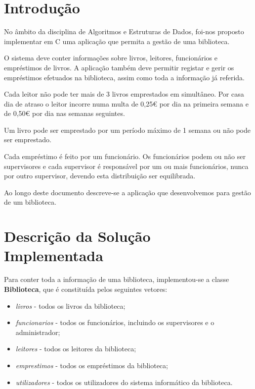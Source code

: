 \documentclass[12pt,a4paper,reqno]{report}
\numberwithin{figure}{section}
\numberwithin{equation}{section}
\def\Cpp{C\raisebox{0.5ex}{\tiny\textbf{++}}}
\begin{document}


\tableofcontents

\chapter{Introdução}

No âmbito da disciplina de Algoritmos e Estruturas de Dados, foi-nos proposto implementar em \Cpp{} uma aplicação que permita a gestão de uma biblioteca.

O sistema deve conter informações sobre livros, leitores, funcionários e empréstimos de livros. A aplicação também deve permitir registar e gerir os empréstimos efetuados na biblioteca, assim como toda a informação já referida.

Cada leitor não pode ter mais de 3 livros emprestados em simultâneo. Por casa dia de atraso o leitor incorre numa multa de 0,25\euro{} por dia na primeira semana e de 0,50\euro{} por dia nas semanas seguintes.

Um livro pode ser emprestado por um período máximo de 1 semana ou não pode ser emprestado.

Cada empréstimo é feito por um funcionário. Os funcionários podem ou não ser supervisores e cada supervisor é responsável por um ou mais funcionários, nunca por outro supervisor, devendo esta distribuição ser equilibrada.

Ao longo deste documento descreve-se a aplicação que desenvolvemos para gestão de um biblioteca.

\chapter{Descrição da Solução Implementada}

Para conter toda a informação de uma biblioteca, implementou-se a classe \textbf{Biblioteca}, que é constituída pelos seguintes vetores:
\begin{itemize}
\item \textit{livros} - todos os livros da biblioteca;
\item \textit{funcionarios} - todos os funcionários, incluindo os supervisores e o administrador;
\item \textit{leitores} - todos os leitores da biblioteca;
\item \textit{emprestimos} - todos os empréstimos da biblioteca;
\item \textit{utilizadores} - todos os utilizadores do sistema informático da biblioteca.
\end{itemize}
\end{document}
